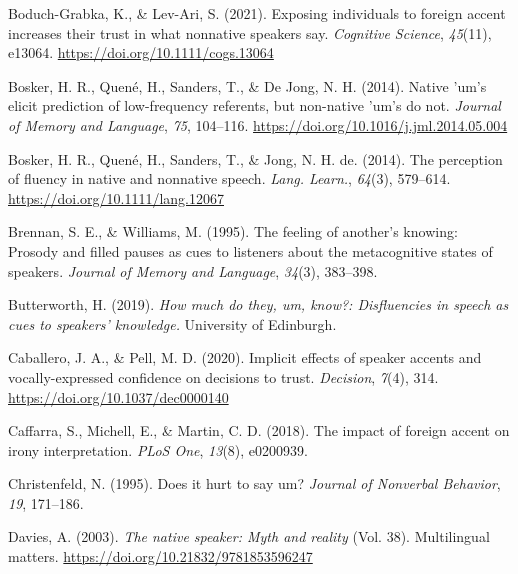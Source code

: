 \documentclass[
  man,floatsintext]{apa7}
\newlength{\cslhangindent}
\newlength{\cslentryspacingunit} %
\newenvironment{CSLReferences}[2] %
 {%
  \setlength{\parindent}{0pt}
  \ifodd #1
  \let\oldpar\par
  \def\par{\hangindent=\cslhangindent\oldpar}
  \fi
  \setlength{\parskip}{#2\cslentryspacingunit}
 }%
 {}
\begin{document}
\begin{CSLReferences}{1}{0}
\leavevmode{}%
Boduch-Grabka, K., \& Lev-Ari, S. (2021). Exposing individuals to foreign accent increases their trust in what nonnative speakers say. \emph{Cognitive Science}, \emph{45}(11), e13064. \url{https://doi.org/10.1111/cogs.13064}

\leavevmode{}%
Bosker, H. R., Quené, H., Sanders, T., \& De Jong, N. H. (2014). Native 'um's elicit prediction of low-frequency referents, but non-native 'um's do not. \emph{Journal of Memory and Language}, \emph{75}, 104--116. \url{https://doi.org/10.1016/j.jml.2014.05.004}

\leavevmode{}%
Bosker, H. R., Quené, H., Sanders, T., \& Jong, N. H. de. (2014). The perception of fluency in native and nonnative speech. \emph{Lang. Learn.}, \emph{64}(3), 579--614. \url{https://doi.org/10.1111/lang.12067}

\leavevmode{}%
Brennan, S. E., \& Williams, M. (1995). The feeling of another's knowing: Prosody and filled pauses as cues to listeners about the metacognitive states of speakers. \emph{Journal of Memory and Language}, \emph{34}(3), 383--398.

\leavevmode{}%
Butterworth, H. (2019). \emph{How much do they, um, know?: Disfluencies in speech as cues to speakers' knowledge.} University of Edinburgh.

\leavevmode{}%
Caballero, J. A., \& Pell, M. D. (2020). Implicit effects of speaker accents and vocally-expressed confidence on decisions to trust. \emph{Decision}, \emph{7}(4), 314. \url{https://doi.org/10.1037/dec0000140}

\leavevmode{}%
Caffarra, S., Michell, E., \& Martin, C. D. (2018). The impact of foreign accent on irony interpretation. \emph{{PLoS} One}, \emph{13}(8), e0200939.

\leavevmode{}%
Christenfeld, N. (1995). Does it hurt to say um? \emph{Journal of Nonverbal Behavior}, \emph{19}, 171--186.

\leavevmode{}%
Davies, A. (2003). \emph{The native speaker: Myth and reality} (Vol. 38). Multilingual matters. \url{https://doi.org/10.21832/9781853596247}


\end{CSLReferences}
\end{document}
